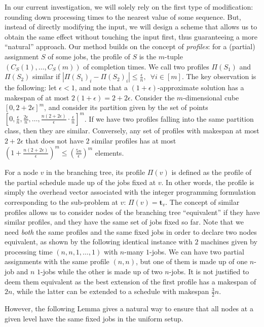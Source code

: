 \documentclass[a4paper,UKenglish,cleveref, autoref, thm-restate, pdfa]{lipics-v2021}
\theoremstyle{plain}
\begin{document}
In our current investigation, we will solely rely on the first type of modification: rounding down processing times to the nearest value of some sequence. But, instead of directly modifying the input, we will design a scheme that allows us to obtain the same effect without touching the input first, thus guaranteeing a more ``natural'' approach. Our method builds on the concept of  
\emph{profiles}: for a (partial) assignment $S$ of some jobs, the profile of $S$ is the $m$-tuple $(C_S(1), \ldots, C_S(m))$ of completion times. We call two profiles $\Pi(S_1)$ and $\Pi(S_2)$ similar if $|\Pi(S_1)_i - \Pi(S_2)_i| \le \frac{\epsilon}{n}, \,\,\,\forall i \in [m]$. The key observation is the following: let $\epsilon < 1$, and note that a $(1+\epsilon)$-approximate solution has a makespan of at most $2(1+\epsilon)= 2 + 2\epsilon$. Consider the $m$-dimensional cube $[0,2+2\epsilon]^m$, and consider its partition given by the set of points $[0,\frac{\epsilon}{n}, \frac{2\epsilon}{n}, \ldots, \frac{n(2+2\epsilon)}{\epsilon}\cdot \frac{\epsilon}{n}]^m$. If we have two profiles falling into the same partition class, then they are similar. Conversely, any set of profiles with makespan at most $2+2\epsilon$ that does not have $2$ similar profiles has at most $\left(1+\frac{n(2+2\epsilon)}{\epsilon}\right)^m \le \left(\frac{5n}{\epsilon}\right)^m$ elements.

For a node $v$ in the branching tree, its profile $\Pi(v)$ is defined as the profile of the partial schedule made up of the jobs fixed at $v$. In other words, the profile is simply the overhead vector associated with the integer programming formulation corresponding to the sub-problem at $v$: $\Pi(v) = \bm{t}_v$. The concept of similar profiles allows us to consider nodes of the branching tree ``equivalent'' if they have similar profiles, and they have the same set of jobs fixed so far. Note that we need \emph{both} the same profiles and the same fixed jobs in order to declare two nodes equivalent, as shown by the following identical instance with $2$ machines given by processing time $(n,n,1,\ldots, 1)$ with $n$-many $1$-jobs. We can have two partial assignments with the same profile $(n,n)$, but one of them is made up of one $n$-job and $n$ $1$-jobs while the other is made up of two $n$-jobs. It is not justified to deem them equivalent as the best extension of the first profile has a makespan of $2n$, while the latter can be extended to a schedule with makespan $\frac{3}{2}n$.

However, the following Lemma gives a natural way to ensure that all nodes at a given level have the same fixed jobs in the uniform setup.
\end{document}
